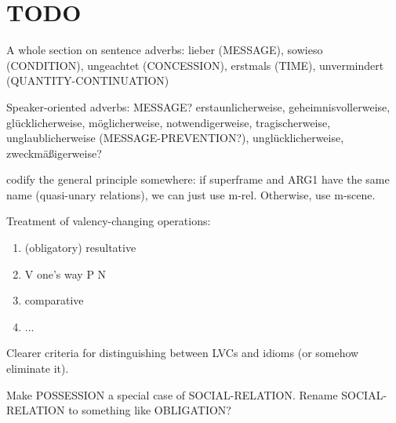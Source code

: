 \documentclass[a4paper]{article}
\begin{document}
\newpage\section{TODO}

A whole section on sentence adverbs: lieber (MESSAGE), sowieso (CONDITION),
ungeachtet (CONCESSION), erstmals (TIME), unvermindert (QUANTITY-CONTINUATION)

Speaker-oriented adverbs: MESSAGE? erstaunlicherweise, geheimnisvollerweise,
glücklicherweise, möglicherweise, notwendigerweise, tragischerweise,
unglaublicherweise (MESSAGE-PREVENTION?), unglücklicherweise, zweckmäßigerweise?

codify the general principle somewhere: if superframe and ARG1 have the same
name (quasi-unary relations), we can just use m-rel. Otherwise, use m-scene.

Treatment of valency-changing operations:

\begin{enumerate}
    \item (obligatory) resultative
    \item V one's way P N
    \item comparative
    \item ...
\end{enumerate}

Clearer criteria for distinguishing between LVCs and idioms (or somehow eliminate it).

Make POSSESSION a special case of SOCIAL-RELATION. Rename SOCIAL-RELATION to
something like OBLIGATION?



\end{document}
